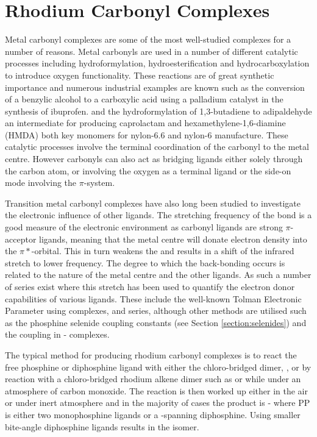 \section{Rhodium Carbonyl Complexes}

Metal carbonyl complexes are some of the most well-studied complexes for a number of reasons.  Metal carbonyls are used in a number of different catalytic processes including hydroformylation, hydroesterification and hydrocarboxylation to introduce oxygen functionality.  These reactions are of great synthetic importance and numerous industrial examples are known such as the conversion of a benzylic alcohol to a carboxylic acid using a palladium catalyst in the synthesis of ibuprofen.\cite{Kjonaas2011} and the hydroformylation of 1,3-butadiene to adipaldehyde an intermediate for producing caprolactam and hexamethylene-1,6-diamine (HMDA) both key monomers for nylon-6.6 and nylon-6 manufacture.\cite{Franke2012}  These catalytic processes involve the terminal coordination of the carbonyl to the metal centre.  However carbonyls can also act as bridging ligands either solely through the carbon atom, or involving the oxygen as a terminal ligand or the side-on  mode involving the $\pi$-system.  

Transition metal carbonyl complexes have also long been studied to investigate the electronic influence of other ligands.  The stretching frequency of the  bond is a good measure of the electronic environment as carbonyl ligands are strong $\pi$-acceptor ligands, meaning that the metal centre will donate electron density into the $\pi*$-orbital.  This in turn weakens the  and results in a shift of the infrared  stretch to lower frequency.  The degree to which the back-bonding occurs is related to the nature of the metal centre and the other ligands.  As such a number of series exist where this stretch has been used to quantify the electron donor capabilities of various ligands.  These include the well-known Tolman Electronic Parameter using \ce{[Ni(CO)3L]} complexes,\cite{Tolman1977} \ce{[Mo(CO)5L]} and \ce{[Rh(CO)ClL2]} series,\cite{Banger2009}  although other methods are utilised such as the phosphine selenide coupling constants (see Section \ref{section:selenides}) and the \JPtP{} coupling in \cis-\ce{[PtCl2L2]} complexes.\cite{Banger2009}

The typical method for producing rhodium carbonyl complexes is to react the free phosphine or diphosphine ligand with either the chloro-bridged dimer, , or by reaction with a chloro-bridged rhodium alkene dimer such as  or  while under an atmosphere of carbon monoxide.  The reaction is then worked up either in the air or under inert atmosphere and in the majority of cases the product is \trans-\ce{[Rh(CO)(PP)Cl]} where PP is either two monophosphine ligands or a \trans-spanning diphosphine.  Using smaller bite-angle diphosphine ligands results in the \cis{} isomer.  

